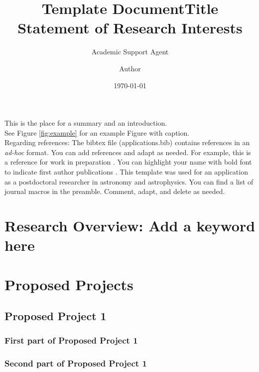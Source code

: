 \documentclass{article}
\title{Template Document}
\author{Academic Support Agent}
\date{\today}
\begin{document}
\maketitle

\title{\textbf{Title}\\Statement of Research Interests}
\author{Author}
\date{}
\maketitle
This is the place for a summary and an introduction.\\

See Figure \ref{fig:example} for an example Figure with caption.\\

Regarding references: The bibtex file (applications.bib) contains references in an \textit{ad-hoc} format. You can add references and adapt as needed. For example, this is a reference for work in preparation \cite{Doe:inprep}. You can highlight your name with bold font to indicate first author publications \cite{Doe:2022}. This template was used for an application as a postdoctoral researcher in astronomy and astrophysics. You can find a list of journal macros in the preamble. Comment, adapt, and delete as needed.



\section{Research Overview: Add a keyword here}
\label{sec:methods}

\section{Proposed Projects}
\label{sec:proposed_projects}

\subsection{Proposed Project 1}
\label{subsec:proposed_project_1}

\subsubsection{First part of Proposed Project 1}
\subsubsection{Second part of Proposed Project 1}
\end{document}

